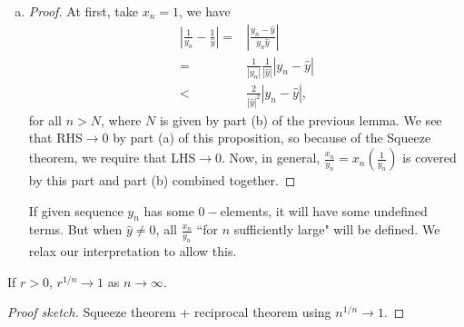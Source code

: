 \begin{enumerate}[(a)]
	\item 
	\begin{proof}
		At first, take \(x_n=1\), we have 
		\begin{align*}
			\left|\frac{1}{y_n}-\frac{1}{\hat{y}}\right|=&\left|\frac{y_n-\hat{y}}{y_n\hat{y}}\right|\\
			=&\frac{1}{|y_n|}\frac{1}{|\hat{y}|}|y_n-\hat{y}|\\
			<&\frac{2}{|\hat{y}|^2}|y_n-\hat{y}|,
		\end{align*}
		for all \(n>N\), where \(N\) is given by part (b) of the previous lemma. We see that RHS\(\to 0\) by part (a) of this proposition, so because of the Squeeze theorem, we require that LHS\(\to 0\). Now, in general, \(\displaystyle\frac{x_n}{y_n}=x_n\left(\displaystyle\frac{1}{y_n}\right)\) is covered by this part and part (b) combined together.
	\end{proof}
	\begin{note}
		If given sequence \(y_n\) has some \(0-\)elements, it will have some undefined terms. But when \(\hat{y}\neq 0\), all \(\displaystyle\frac{x_n}{y_n}\) ``for \(n\) sufficiently large" will be defined. We relax our interpretation to allow this.
	\end{note}
\end{enumerate}
\begin{example}
	If \(r>0\), \(r^{1/n}\to 1\) as \(n\to\infty\).
\end{example}
\begin{proof}[Proof sketch]
	Squeeze theorem + reciprocal theorem using \(n^{1/n}\to 1\).
\end{proof}